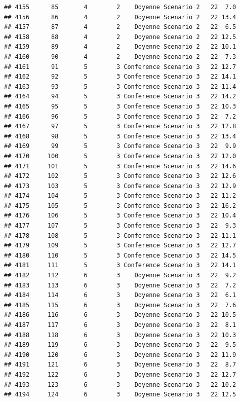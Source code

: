 \documentclass[
]{article}
\begin{document}
\begin{verbatim}
## 4155      85       4        2    Doyenne Scenario 2   22  7.0
## 4156      86       4        2    Doyenne Scenario 2   22 13.4
## 4157      87       4        2    Doyenne Scenario 2   22  6.5
## 4158      88       4        2    Doyenne Scenario 2   22 12.5
## 4159      89       4        2    Doyenne Scenario 2   22 10.1
## 4160      90       4        2    Doyenne Scenario 2   22  7.3
## 4161      91       5        3 Conference Scenario 3   22 12.7
## 4162      92       5        3 Conference Scenario 3   22 14.1
## 4163      93       5        3 Conference Scenario 3   22 11.4
## 4164      94       5        3 Conference Scenario 3   22 14.2
## 4165      95       5        3 Conference Scenario 3   22 10.3
## 4166      96       5        3 Conference Scenario 3   22  7.2
## 4167      97       5        3 Conference Scenario 3   22 12.8
## 4168      98       5        3 Conference Scenario 3   22 13.4
## 4169      99       5        3 Conference Scenario 3   22  9.9
## 4170     100       5        3 Conference Scenario 3   22 12.0
## 4171     101       5        3 Conference Scenario 3   22 14.6
## 4172     102       5        3 Conference Scenario 3   22 12.6
## 4173     103       5        3 Conference Scenario 3   22 12.9
## 4174     104       5        3 Conference Scenario 3   22 11.2
## 4175     105       5        3 Conference Scenario 3   22 16.2
## 4176     106       5        3 Conference Scenario 3   22 10.4
## 4177     107       5        3 Conference Scenario 3   22  9.3
## 4178     108       5        3 Conference Scenario 3   22 11.1
## 4179     109       5        3 Conference Scenario 3   22 12.7
## 4180     110       5        3 Conference Scenario 3   22 14.5
## 4181     111       5        3 Conference Scenario 3   22 14.1
## 4182     112       6        3    Doyenne Scenario 3   22  9.2
## 4183     113       6        3    Doyenne Scenario 3   22  7.2
## 4184     114       6        3    Doyenne Scenario 3   22  6.1
## 4185     115       6        3    Doyenne Scenario 3   22  7.6
## 4186     116       6        3    Doyenne Scenario 3   22 10.5
## 4187     117       6        3    Doyenne Scenario 3   22  8.1
## 4188     118       6        3    Doyenne Scenario 3   22 10.3
## 4189     119       6        3    Doyenne Scenario 3   22  9.5
## 4190     120       6        3    Doyenne Scenario 3   22 11.9
## 4191     121       6        3    Doyenne Scenario 3   22  8.7
## 4192     122       6        3    Doyenne Scenario 3   22 12.7
## 4193     123       6        3    Doyenne Scenario 3   22 10.2
## 4194     124       6        3    Doyenne Scenario 3   22 12.5

\end{verbatim}
\end{document}
